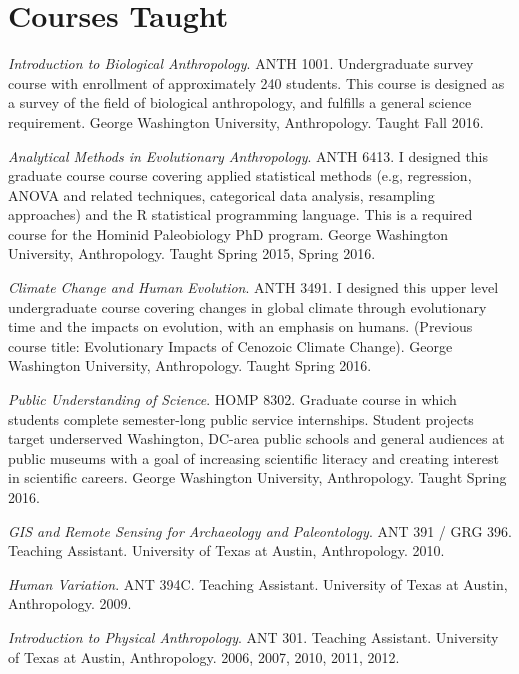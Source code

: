\documentclass{article}
\begin{document}
\section*{Courses Taught}
\begin{description*}

\item[]\emph{Introduction to Biological Anthropology}. ANTH 1001. Undergraduate survey course with enrollment of approximately 240 students. This course is designed as a survey of the field of biological anthropology, and fulfills a general science requirement. George Washington University, Anthropology. Taught Fall 2016.

\item[] \emph{Analytical Methods in Evolutionary Anthropology}. ANTH 6413. I designed this graduate course course covering applied statistical methods (e.g, regression, ANOVA and related techniques, categorical data analysis, resampling approaches) and the R statistical programming language. This is a required course for the Hominid Paleobiology PhD program. George Washington University, Anthropology. Taught Spring 2015, Spring 2016.

\item[] \emph{Climate Change and Human Evolution}. ANTH 3491. I designed this upper level undergraduate course covering changes in global climate through evolutionary time and the impacts on evolution, with an emphasis on humans. (Previous course title: Evolutionary Impacts of Cenozoic Climate Change). George Washington University, Anthropology. Taught Spring 2016.

\item[] \emph{Public Understanding of Science}. HOMP 8302.  Graduate course in which students complete semester-long public service internships. Student projects target underserved Washington, DC-area public schools and general audiences at public museums with a goal of increasing scientific literacy and creating interest in scientific careers. George Washington University, Anthropology. Taught Spring 2016.

\item[] \emph{GIS and Remote Sensing for Archaeology and Paleontology}. ANT 391 / GRG 396. Teaching Assistant.  University of Texas at Austin, Anthropology. 2010.

\item[] \emph{Human Variation}. ANT 394C. Teaching Assistant. University of Texas at Austin, Anthropology. 2009.

\item[] \emph{Introduction to Physical Anthropology}. ANT 301. Teaching Assistant. University of Texas at Austin, Anthropology. 2006, 2007, 2010, 2011, 2012.
\end{description*}
\end{document}

